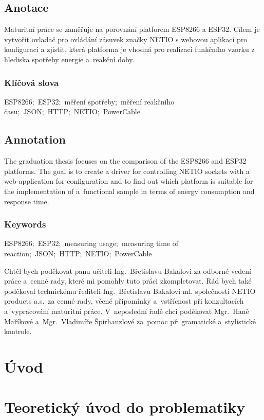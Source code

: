 \documentclass[a4paper, 12pt]{report}
\begin{document}
    \nocite{*}
    \renewcommand{\listingscaption}{Úryvek kódu}


    \titulniStrana
    \section*{Anotace}
    Maturitní práce se zaměřuje na porovnání platforem ESP8266 a ESP32.
    Cílem je vytvořit ovladač pro ovládání zásuvek značky NETIO s webovou aplikací pro konfiguraci a zjistit, která platforma je vhodná pro realizaci funkčního vzorku z hlediska spotřeby energie a~reakční doby.
    \subsection*{Klíčová slova}
    ESP8266;\ ESP32;\ měření spotřeby;\ měření reakčního času;\ JSON;\ HTTP;\ NETIO;\ PowerCable

    \section*{Annotation}
    The graduation thesis focuses on the comparison of the ESP8266 and ESP32 platforms. The goal is to create a driver for controlling NETIO sockets with a web application for configuration and to find out which platform is suitable for the implementation of a~functional sample in terms of energy consumption and response time.
    \subsection*{Keywords}
    ESP8266;\ ESP32;\ measuring usage;\ measuring time of reaction;\ JSON;\ HTTP;\ NETIO;\ PowerCable

    \podekovani
    Chtěl bych poděkovat panu učiteli Ing.~Břetislavu Bakalovi za odborné vedení práce a~cenné rady, které mi pomohly tuto práci zkompletovat.
    Rád bych také poděkoval technickému řediteli Ing.~Břetislavu Bakalovi ml.
    společnosti NETIO products a.s.\ za cenné rady, věcné připomínky a~vstřícnost při konzultacích a~vypracování maturitní práce.
    V~neposlední řadě chci poděkovat Mgr.~Haně Maříkové a~Mgr.~Vladimíře Špirhanzlové za~pomoc při gramatické a~stylistické kontrole.
    \tableofcontents


    \chapter{Úvod}\label{ch:uvod}


    \chapter{Teoretický úvod do problematiky}\label{ch:teorie}
\end{document}
